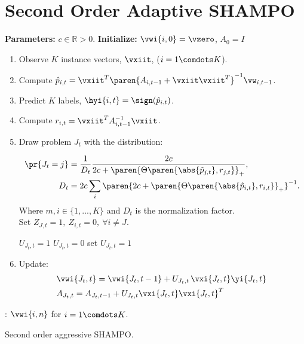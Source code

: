 \chapter{Second Order Adaptive SHAMPO}


\begin{algorithm}
\begin{algorithmic}
   \State \textbf{Parameters:}  $c\in\mathbb{R}>0$.
   \State \textbf{Initialize:} $\vwi{i,0}=\vzero$, $A_0=I$ \\
     \begin{enumerate}
     \nolineskips
     \item Observe $K$ instance vectors, $\vxiit$, ($i=1 \comdots K$).
     \item Compute  $\hat{p}_{i,t}=\vxiit^T \paren{A_{i,t-1}+\vxiit\vxiit^T}^{-1}\vw_{i,t-1}$.
     \item Predict $K$ labels, $\hyi{i,t}=\sign(\hat{p}_{i,t})$.
      \item Compute $r_{i,t} = \vxiit^T A_{i,t-1}^{-1}\vxiit$.
     \item Draw problem $J_t$  with the distribution:
     
      \begin{align}
     \pr{J_t=j} &=
     \frac{1}{D_{t}}\frac{2c}{2c+\paren{\Theta\paren{\abs{\hat{p}_{j,t}},r_{j,t}}}_+}, \nonumber\\
     D_t &=2c
     \sum_i \paren{2c+\paren{\Theta\paren{\abs{\hat{p}_{i,t}},r_{i,t}}}_+}^{-1}. \nonumber
     \end{align}
     Where $m,i\in\{1,...,K\}$ and $D_t$ is the normalization factor. \\
     Set $Z_{J,t}=1,~Z_{i,t}=0 , ~\forall i\ne J $.

     
            \State $U_{J_t,t}=1$
         \Else
            \State $U_{J_t,t}=0$
        \EndIf
    \Else 
        \State set $U_{J_t,t}=1$
    \EndIf
     
     \item Update:
     \begin{align}
     &\vwi{J_t,t} = \vwi{J_t,t-1}+U_{J_t,t}\,  \vxi{J_t,t}  \yi{J_t,t}\,\label{perc_update}\\
     &A_{J_t,t}=A_{J_t,t-1}+ U_{J_t,t}\vxi{J_t,t}\vxi{J_t,t}^T\nonumber
     \end{align}

     
     \end{enumerate}
   \EndFor  
   : $\vwi{i,n}$ for $i=1 \comdots K$.
\end{algorithmic}
\caption{Second order aggressive SHAMPO. \label{alg:SHAMPO}}
\end{algorithm}



